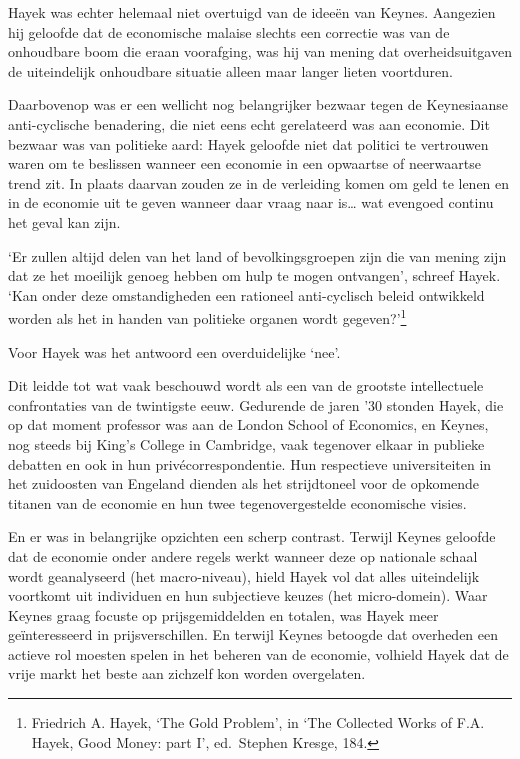 \documentclass[
  a5paper,
  smalldemyvopaper,11pt,twoside,onecolumn,openright,extrafontsizes]{memoir}
\begin{document}
Hayek was echter helemaal niet overtuigd van de ideeën van Keynes.
Aangezien hij geloofde dat de economische malaise slechts een correctie
was van de onhoudbare boom die eraan voorafging, was hij van mening dat
overheidsuitgaven de uiteindelijk onhoudbare situatie alleen maar langer
lieten voortduren.

Daarbovenop was er een wellicht nog belangrijker bezwaar tegen de
Keynesiaanse anti-cyclische benadering, die niet eens echt gerelateerd
was aan economie. Dit bezwaar was van politieke aard: Hayek geloofde
niet dat politici te vertrouwen waren om te beslissen wanneer een
economie in een opwaartse of neerwaartse trend zit. In plaats daarvan
zouden ze in de verleiding komen om geld te lenen en in de economie uit
te geven wanneer daar vraag naar is\ldots{} wat evengoed continu het
geval kan zijn.

`Er zullen altijd delen van het land of bevolkingsgroepen zijn die van
mening zijn dat ze het moeilijk genoeg hebben om hulp te mogen
ontvangen', schreef Hayek. `Kan onder deze omstandigheden een rationeel
anti-cyclisch beleid ontwikkeld worden als het in handen van politieke
organen wordt gegeven?'\footnote{\hspace{0pt}Friedrich A. Hayek, `The
  Gold Problem', in `The Collected Works of F.A. Hayek, Good Money: part
  I', ed.~Stephen Kresge, 184.}

Voor Hayek was het antwoord een overduidelijke `nee'.

Dit leidde tot wat vaak beschouwd wordt als een van de grootste
intellectuele confrontaties van de twintigste eeuw. Gedurende de jaren
'30 stonden Hayek, die op dat moment professor was aan de London School
of Economics, en Keynes, nog steeds bij King's College in Cambridge,
vaak tegenover elkaar in publieke debatten en ook in hun
privécorrespondentie. Hun respectieve universiteiten in het zuidoosten
van Engeland dienden als het strijdtoneel voor de opkomende titanen van
de economie en hun twee tegenovergestelde economische visies.

En er was in belangrijke opzichten een scherp contrast. Terwijl Keynes
geloofde dat de economie onder andere regels werkt wanneer deze op
nationale schaal wordt geanalyseerd (het macro-niveau), hield Hayek vol
dat alles uiteindelijk voortkomt uit individuen en hun subjectieve
keuzes (het micro-domein). Waar Keynes graag focuste op prijsgemiddelden
en totalen, was Hayek meer geïnteresseerd in prijsverschillen. En
terwijl Keynes betoogde dat overheden een actieve rol moesten spelen in
het beheren van de economie, volhield Hayek dat de vrije markt het beste
aan zichzelf kon worden overgelaten.
\end{document}
